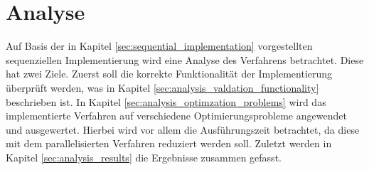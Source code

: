 \chapter{Analyse}
\label{chap:analysis}
Auf Basis der in Kapitel \ref{sec:sequential_implementation} vorgestellten sequenziellen Implementierung wird eine Analyse des Verfahrens betrachtet. Diese hat zwei Ziele. Zuerst soll die korrekte Funktionalität der Implementierung überprüft werden, was in Kapitel \ref{sec:analysis_valdation_functionality} beschrieben ist. In Kapitel \ref{sec:analysis_optimzation_problems} wird das implementierte Verfahren auf verschiedene Optimierungsprobleme angewendet und ausgewertet. Hierbei wird vor allem die Ausführungszeit betrachtet, da diese mit dem parallelisierten Verfahren reduziert werden soll. Zuletzt werden in Kapitel \ref{sec:analysis_results} die Ergebnisse zusammen gefasst. 





